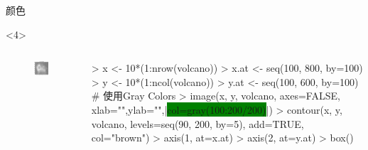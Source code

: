 \documentclass{beamerthemeMono}
\begin{document}
\begin{frame}[t,fragile]{\subsecname}{颜色}
\begin{overlayarea}{\textwidth}{\textheight}
\begin{onlyenv}<4>
  \begin{columns}
    \begin{column}{.4\textwidth}
\centering
\begin{figure}
  \includegraphics[width=\columnwidth]{gray_colors.png}
\end{figure}
    \end{column}

    \begin{column}{.6\textwidth}
\centering
\begin{rcode}
> x <- 10*(1:nrow(volcano))
> x.at <- seq(100, 800, by=100)
> y <- 10*(1:ncol(volcano))
> y.at <- seq(100, 600, by=100)
# 使用Gray Colors 
> image(x, y, volcano, axes=FALSE, xlab="",ylab="",|\colorbox{green}{col=gray(100:200/200)}|)
> contour(x, y, volcano, levels=seq(90, 200, by=5), add=TRUE, col="brown")
> axis(1, at=x.at)
> axis(2, at=y.at)
> box()
\end{rcode}
    \end{column}
  \end{columns}
\end{onlyenv}

\end{overlayarea}  
\end{frame}
\end{document}

